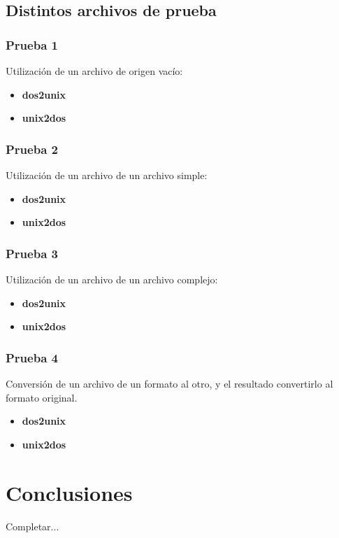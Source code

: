 \documentclass[a4paper,10pt]{article}
\begin{document}
  \subsection{Distintos archivos de prueba}
    \subsubsection{Prueba 1}
    Utilizaci\'on de un archivo de origen vac\'io:
      \begin{itemize}
      \item \textbf{dos2unix}
      \item \textbf{unix2dos}
      \end{itemize}

    \subsubsection{Prueba 2}
    Utilizaci\'on de un archivo de un archivo simple:
      \begin{itemize}
      \item \textbf{dos2unix}
      \item \textbf{unix2dos}
      \end{itemize}

    \subsubsection{Prueba 3}
    Utilizaci\'on de un archivo de un archivo complejo:
      \begin{itemize}
      \item \textbf{dos2unix}
      \item \textbf{unix2dos}
      \end{itemize}

    \subsubsection{Prueba 4}
    Conversi\'on de un archivo de un formato al otro, y el resultado convertirlo al formato original.
      \begin{itemize}
      \item \textbf{dos2unix}
      \item \textbf{unix2dos}
      \end{itemize}
\section{Conclusiones}
Completar...
\end{document}
